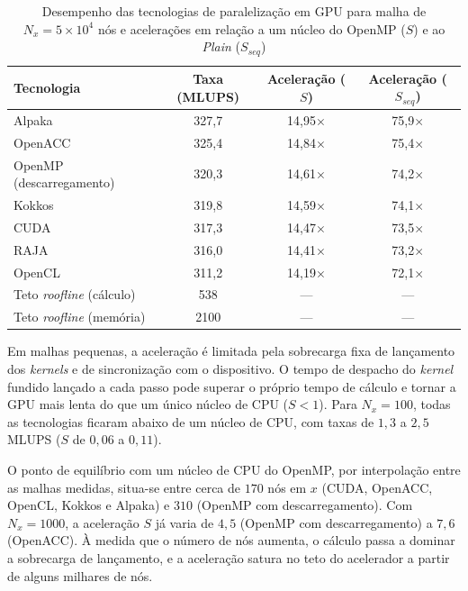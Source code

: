 \begin{table}[H]
    \centering
    \caption{Desempenho das tecnologias de paralelização em GPU para malha de \(N_x=5\times10^4\) nós e acelerações em relação a um núcleo do OpenMP (\(S\)) e ao \textit{Plain} (\(S_{seq}\))}
    \label{tab:desempenho-gpu-tecnologias}
    \footnotesize
    \begin{tabular}{lccc}
        \toprule
        Tecnologia & Taxa (MLUPS) & Aceleração (\(S\)) & Aceleração (\(S_{seq}\)) \\
        \midrule
        Alpaka & 327{,}7 & 14{,}95\(\times\) & 75{,}9\(\times\) \\
        OpenACC & 325{,}4 & 14{,}84\(\times\) & 75{,}4\(\times\) \\
        OpenMP (descarregamento) & 320{,}3 & 14{,}61\(\times\) & 74{,}2\(\times\) \\
        Kokkos & 319{,}8 & 14{,}59\(\times\) & 74{,}1\(\times\) \\
        CUDA & 317{,}3 & 14{,}47\(\times\) & 73{,}5\(\times\) \\
        RAJA & 316{,}0 & 14{,}41\(\times\) & 73{,}2\(\times\) \\
        OpenCL & 311{,}2 & 14{,}19\(\times\) & 72{,}1\(\times\) \\
        \midrule
        Teto \textit{roofline} (cálculo) & 538 & --- & --- \\
        Teto \textit{roofline} (memória) & 2100 & --- & --- \\
        \bottomrule
    \end{tabular}
\end{table}

Em malhas pequenas, a aceleração é limitada pela sobrecarga fixa de lançamento dos \textit{kernels} e de sincronização com o dispositivo.
O tempo de despacho do \textit{kernel} fundido lançado a cada passo pode superar o próprio tempo de cálculo e tornar a GPU mais lenta do que um único núcleo de CPU (\(S < 1\)).
Para \(N_x = 100\), todas as tecnologias ficaram abaixo de um núcleo de CPU, com taxas de \(1{,}3\) a \(2{,}5\) MLUPS (\(S\) de \(0{,}06\) a \(0{,}11\)).

O ponto de equilíbrio com um núcleo de CPU do OpenMP, por interpolação entre as malhas medidas, situa-se entre cerca de \(170\) nós em \(x\) (CUDA, OpenACC, OpenCL, Kokkos e Alpaka) e \(310\) (OpenMP com descarregamento).
Com \(N_x = 1000\), a aceleração \(S\) já varia de \(4{,}5\) (OpenMP com descarregamento) a \(7{,}6\) (OpenACC).
À medida que o número de nós aumenta, o cálculo passa a dominar a sobrecarga de lançamento, e a aceleração satura no teto do acelerador a partir de alguns milhares de nós.

